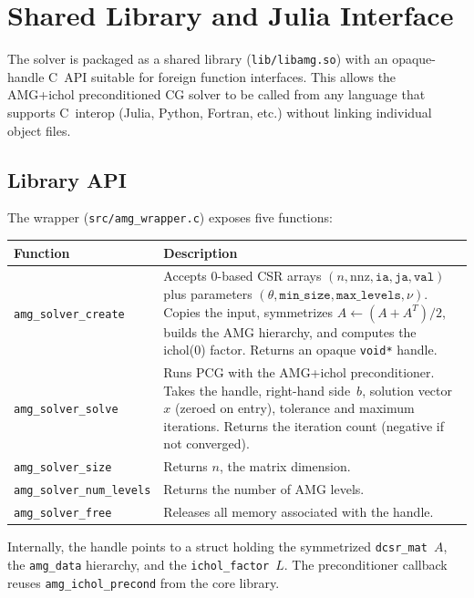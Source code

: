 \documentclass[11pt]{article}
\begin{document}
\section{Shared Library and Julia Interface}
\label{sec:library}

The solver is packaged as a shared library (\texttt{lib/libamg.so})
with an opaque-handle C~API suitable for foreign function interfaces.
This allows the AMG+ichol preconditioned CG solver to be called from
any language that supports C~interop (Julia, Python, Fortran, etc.)
without linking individual object files.

\subsection{Library API}

The wrapper (\texttt{src/amg\_wrapper.c}) exposes five functions:

\begin{center}
\begin{tabular}{lp{7.5cm}}
  \toprule
  Function & Description \\
  \midrule
  \verb|amg_solver_create| &
    Accepts 0-based CSR arrays $(n, \mathrm{nnz}, \mathtt{ia}, \mathtt{ja},
    \mathtt{val})$ plus parameters $(\theta, \mathtt{min\_size},
    \mathtt{max\_levels}, \nu)$.  Copies the input, symmetrizes
    $A \leftarrow (A + A^T)/2$, builds the AMG hierarchy, and computes
    the ichol(0) factor.  Returns an opaque \verb|void*| handle. \\
  \verb|amg_solver_solve| &
    Runs PCG with the AMG+ichol preconditioner.  Takes the handle,
    right-hand side~$b$, solution vector~$x$ (zeroed on entry),
    tolerance and maximum iterations.  Returns the iteration count
    (negative if not converged). \\
  \verb|amg_solver_size| & Returns $n$, the matrix dimension. \\
  \verb|amg_solver_num_levels| & Returns the number of AMG levels. \\
  \verb|amg_solver_free| & Releases all memory associated with the handle. \\
  \bottomrule
\end{tabular}
\end{center}

Internally, the handle points to a struct holding the symmetrized
\texttt{dcsr\_mat}~$A$, the \texttt{amg\_data} hierarchy, and the
\texttt{ichol\_factor}~$L$.  The preconditioner callback reuses
\texttt{amg\_ichol\_precond} from the core library.
\end{document}
